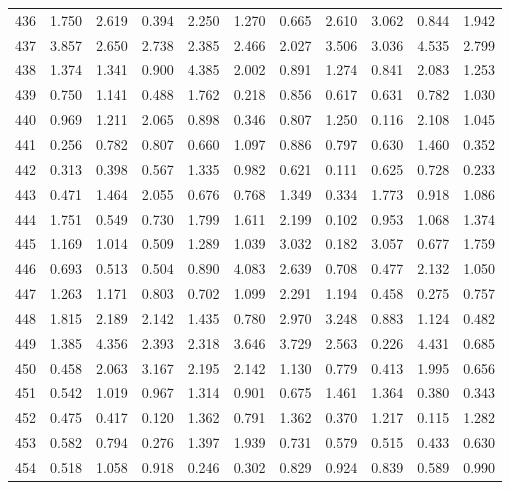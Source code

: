 \begin{tabular}{lrrrrrrrrrr}
436 &  1.750 &  2.619 &  0.394 &  2.250 &  1.270 &  0.665 &  2.610 &  3.062 &  0.844 &  1.942 \\
437 &  3.857 &  2.650 &  2.738 &  2.385 &  2.466 &  2.027 &  3.506 &  3.036 &  4.535 &  2.799 \\
438 &  1.374 &  1.341 &  0.900 &  4.385 &  2.002 &  0.891 &  1.274 &  0.841 &  2.083 &  1.253 \\
439 &  0.750 &  1.141 &  0.488 &  1.762 &  0.218 &  0.856 &  0.617 &  0.631 &  0.782 &  1.030 \\
440 &  0.969 &  1.211 &  2.065 &  0.898 &  0.346 &  0.807 &  1.250 &  0.116 &  2.108 &  1.045 \\
441 &  0.256 &  0.782 &  0.807 &  0.660 &  1.097 &  0.886 &  0.797 &  0.630 &  1.460 &  0.352 \\
442 &  0.313 &  0.398 &  0.567 &  1.335 &  0.982 &  0.621 &  0.111 &  0.625 &  0.728 &  0.233 \\
443 &  0.471 &  1.464 &  2.055 &  0.676 &  0.768 &  1.349 &  0.334 &  1.773 &  0.918 &  1.086 \\
444 &  1.751 &  0.549 &  0.730 &  1.799 &  1.611 &  2.199 &  0.102 &  0.953 &  1.068 &  1.374 \\
445 &  1.169 &  1.014 &  0.509 &  1.289 &  1.039 &  3.032 &  0.182 &  3.057 &  0.677 &  1.759 \\
446 &  0.693 &  0.513 &  0.504 &  0.890 &  4.083 &  2.639 &  0.708 &  0.477 &  2.132 &  1.050 \\
447 &  1.263 &  1.171 &  0.803 &  0.702 &  1.099 &  2.291 &  1.194 &  0.458 &  0.275 &  0.757 \\
448 &  1.815 &  2.189 &  2.142 &  1.435 &  0.780 &  2.970 &  3.248 &  0.883 &  1.124 &  0.482 \\
449 &  1.385 &  4.356 &  2.393 &  2.318 &  3.646 &  3.729 &  2.563 &  0.226 &  4.431 &  0.685 \\
450 &  0.458 &  2.063 &  3.167 &  2.195 &  2.142 &  1.130 &  0.779 &  0.413 &  1.995 &  0.656 \\
451 &  0.542 &  1.019 &  0.967 &  1.314 &  0.901 &  0.675 &  1.461 &  1.364 &  0.380 &  0.343 \\
452 &  0.475 &  0.417 &  0.120 &  1.362 &  0.791 &  1.362 &  0.370 &  1.217 &  0.115 &  1.282 \\
453 &  0.582 &  0.794 &  0.276 &  1.397 &  1.939 &  0.731 &  0.579 &  0.515 &  0.433 &  0.630 \\
454 &  0.518 &  1.058 &  0.918 &  0.246 &  0.302 &  0.829 &  0.924 &  0.839 &  0.589 &  0.990 \\

\end{tabular}
